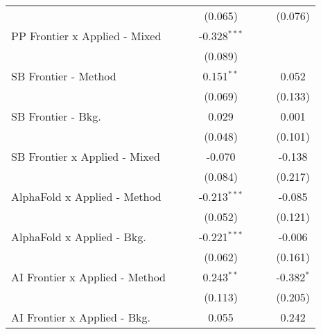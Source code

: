 \begin{tabular}{lcccccc}
                                  &               &                & (0.065)        &               &               & (0.076)\\   
   PP Frontier x Applied - Mixed  &               &                & -0.328$^{***}$ &               &               &   \\   
                                  &               &                & (0.089)        &               &               &   \\   
   SB Frontier - Method           &               &                & 0.151$^{**}$   &               &               & 0.052\\   
                                  &               &                & (0.069)        &               &               & (0.133)\\   
   SB Frontier - Bkg.             &               &                & 0.029          &               &               & 0.001\\   
                                  &               &                & (0.048)        &               &               & (0.101)\\   
   SB Frontier x Applied - Mixed  &               &                & -0.070         &               &               & -0.138\\   
                                  &               &                & (0.084)        &               &               & (0.217)\\   
   AlphaFold x Applied - Method   &               &                & -0.213$^{***}$ &               &               & -0.085\\   
                                  &               &                & (0.052)        &               &               & (0.121)\\   
   AlphaFold x Applied - Bkg.     &               &                & -0.221$^{***}$ &               &               & -0.006\\   
                                  &               &                & (0.062)        &               &               & (0.161)\\   
   AI Frontier x Applied - Method &               &                & 0.243$^{**}$   &               &               & -0.382$^{*}$\\   
                                  &               &                & (0.113)        &               &               & (0.205)\\   
   AI Frontier x Applied - Bkg.   &               &                & 0.055          &               &               & 0.242\\   

\end{tabular}
